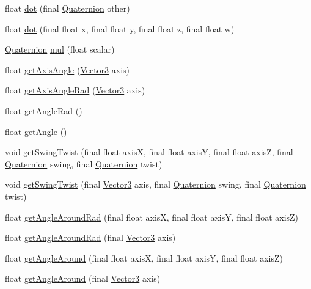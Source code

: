 \begin{DoxyCompactItemize}
\item 
float \hyperlink{classairhockeyjava_1_1util_1_1_quaternion_a979b544b8084e445e8e7a344e78141a6}{dot} (final \hyperlink{classairhockeyjava_1_1util_1_1_quaternion}{Quaternion} other)
\item 
float \hyperlink{classairhockeyjava_1_1util_1_1_quaternion_a1dcbf9681f9ab6332f5ef50132efe4e7}{dot} (final float x, final float y, final float z, final float w)
\item 
\hyperlink{classairhockeyjava_1_1util_1_1_quaternion}{Quaternion} \hyperlink{classairhockeyjava_1_1util_1_1_quaternion_a01237a20c09bc04013c1a9ee1302e1a4}{mul} (float scalar)
\item 
float \hyperlink{classairhockeyjava_1_1util_1_1_quaternion_a5ff0db57b6aabbfd06957873b8baf518}{get\+Axis\+Angle} (\hyperlink{classairhockeyjava_1_1util_1_1_vector3}{Vector3} axis)
\item 
float \hyperlink{classairhockeyjava_1_1util_1_1_quaternion_a5e122d79e3417ac6ee4447a918e279ec}{get\+Axis\+Angle\+Rad} (\hyperlink{classairhockeyjava_1_1util_1_1_vector3}{Vector3} axis)
\item 
float \hyperlink{classairhockeyjava_1_1util_1_1_quaternion_ad4333e5b8f1b08f6069c9e861ac5f87d}{get\+Angle\+Rad} ()
\item 
float \hyperlink{classairhockeyjava_1_1util_1_1_quaternion_a95f10995127d4e6f666606f5281477e6}{get\+Angle} ()
\item 
void \hyperlink{classairhockeyjava_1_1util_1_1_quaternion_a116a381f86e97724559b9cd0342f612b}{get\+Swing\+Twist} (final float axis\+X, final float axis\+Y, final float axis\+Z, final \hyperlink{classairhockeyjava_1_1util_1_1_quaternion}{Quaternion} swing, final \hyperlink{classairhockeyjava_1_1util_1_1_quaternion}{Quaternion} twist)
\item 
void \hyperlink{classairhockeyjava_1_1util_1_1_quaternion_a224cb0422e2c3af896be86c1861542be}{get\+Swing\+Twist} (final \hyperlink{classairhockeyjava_1_1util_1_1_vector3}{Vector3} axis, final \hyperlink{classairhockeyjava_1_1util_1_1_quaternion}{Quaternion} swing, final \hyperlink{classairhockeyjava_1_1util_1_1_quaternion}{Quaternion} twist)
\item 
float \hyperlink{classairhockeyjava_1_1util_1_1_quaternion_a30b4eaae2a72397652250ac4d01202df}{get\+Angle\+Around\+Rad} (final float axis\+X, final float axis\+Y, final float axis\+Z)
\item 
float \hyperlink{classairhockeyjava_1_1util_1_1_quaternion_ac8f26d9b771e7f345e0f627dd8960802}{get\+Angle\+Around\+Rad} (final \hyperlink{classairhockeyjava_1_1util_1_1_vector3}{Vector3} axis)
\item 
float \hyperlink{classairhockeyjava_1_1util_1_1_quaternion_aac8d1f78ef5a6b4acdc08ccdcd80a1b3}{get\+Angle\+Around} (final float axis\+X, final float axis\+Y, final float axis\+Z)
\item 
float \hyperlink{classairhockeyjava_1_1util_1_1_quaternion_a43abd1619d60f6b7d3cba2f281e58d04}{get\+Angle\+Around} (final \hyperlink{classairhockeyjava_1_1util_1_1_vector3}{Vector3} axis)
\end{DoxyCompactItemize}
